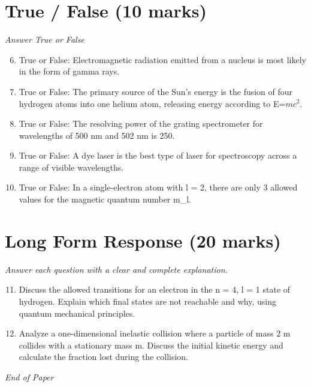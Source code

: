 \documentclass[12pt]{article}
\begin{document}
\section*{True / False (10 marks)}
\textit{Answer True or False}
\begin{enumerate}[label=\arabic*.]
\setcounter{enumi}{5}
\item True or False: Electromagnetic radiation emitted from a nucleus is most likely in the form of gamma rays.
\item True or False: The primary source of the Sun's energy is the fusion of four hydrogen atoms into one helium atom, releasing energy according to E=$mc^2$.
\item True or False: The resolving power of the grating spectrometer for wavelengths of 500 nm and 502 nm is 250.
\item True or False: A dye laser is the best type of laser for spectroscopy across a range of visible wavelengths.
\item True or False: In a single-electron atom with l = 2, there are only 3 allowed values for the magnetic quantum number m\_l.
\end{enumerate}

\section*{Long Form Response (20 marks)}
\textit{Answer each question with a clear and complete explanation.}
\begin{enumerate}[label=\arabic*.]
\setcounter{enumi}{10}
\item Discuss the allowed transitions for an electron in the n = 4, l = 1 state of hydrogen. Explain which final states are not reachable and why, using quantum mechanical principles.
\item Analyze a one-dimensional inelastic collision where a particle of mass 2 m collides with a stationary mass m. Discuss the initial kinetic energy and calculate the fraction lost during the collision.
\end{enumerate}

\vfill
\noindent\textit{End of Paper}
\end{document}
